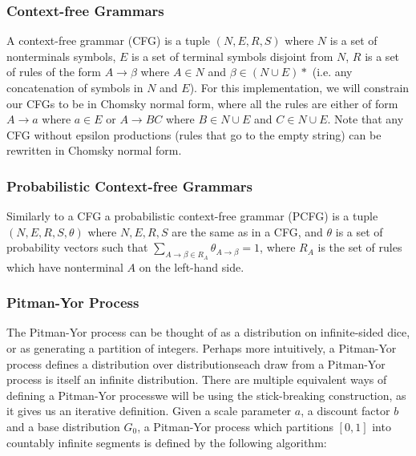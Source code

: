 \documentclass[12pt,letterpaper]{article}
\begin{document}
\subsubsection{Context-free Grammars}
A context-free grammar (CFG) is a tuple $(N, E, R, S)$ where $N$ is a set of nonterminals symbols, $E$ is a set of terminal symbols disjoint from $N$, $R$ is a set of rules of the form $A \rightarrow \beta$ where $A \in N$ and $\beta \in (N \cup E)*$ (i.e. any concatenation of symbols in $N$ and $E$). For this implementation, we will constrain our CFGs to be in Chomsky normal form, where all the rules are either of form $A \rightarrow a$ where $a \in E$ or $A \rightarrow BC$ where $B\in N\cup E$ and $C\in N\cup E$. Note that any CFG without epsilon productions (rules that go to the empty string) can be rewritten in Chomsky normal form. \citep{hopcroft:2006}  

\subsubsection{Probabilistic Context-free Grammars}
Similarly to a CFG a probabilistic context-free grammar (PCFG) is a tuple $(N, E, R, S, \theta)$ where $N,E,R,S$ are the same as in a CFG, and $\theta$ is a set of probability vectors such that $\sum\limits_{A\rightarrow \beta \in R_A} \theta_{A\rightarrow \beta} = 1$, where $R_A$ is the set of rules which have nonterminal $A$ on the left-hand side. 

\subsubsection{Pitman-Yor Process}
The Pitman-Yor process \citep{pitman:1997} can be thought of as a distribution on infinite-sided dice, or as generating a partition of integers. Perhaps more intuitively, a Pitman-Yor process defines a distribution over distributions\textemdash each draw from a Pitman-Yor process is itself an infinite distribution. There are multiple equivalent ways of defining a Pitman-Yor process\textemdash we will be using the stick-breaking construction, as it gives us an iterative definition. Given a scale parameter $a$, a discount factor $b$ and a base distribution $G_0$, a Pitman-Yor process which partitions $[0,1]$ into countably infinite segments is defined by the following algorithm:\\
\end{document}
